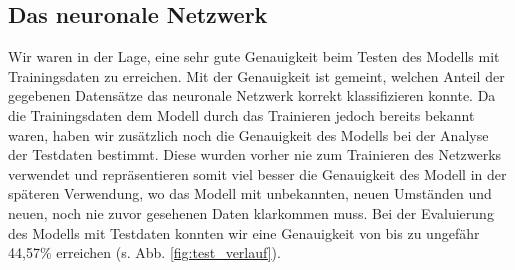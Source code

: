 \documentclass[10pt]{article}
\begin{document}




\subsection{Das neuronale Netzwerk}

Wir waren in der Lage, eine sehr gute Genauigkeit beim Testen des Modells mit Trainingsdaten zu erreichen. 
Mit der Genauigkeit ist gemeint, welchen Anteil der gegebenen Datensätze das neuronale Netzwerk korrekt klassifizieren konnte. 
Da die Trainingsdaten dem Modell durch das Trainieren jedoch bereits bekannt waren, haben wir zusätzlich noch die Genauigkeit des Modells bei der Analyse der Testdaten bestimmt. 
Diese wurden vorher nie zum Trainieren des Netzwerks verwendet und repräsentieren somit viel besser die Genauigkeit des Modell in der späteren Verwendung, wo das Modell mit unbekannten, neuen Umständen und neuen, noch nie zuvor gesehenen Daten klarkommen muss.
Bei der Evaluierung des Modells mit Testdaten konnten wir eine Genauigkeit von bis zu ungefähr 44,57\% erreichen (s. Abb. \ref{fig:test_verlauf}). 
\end{document}
